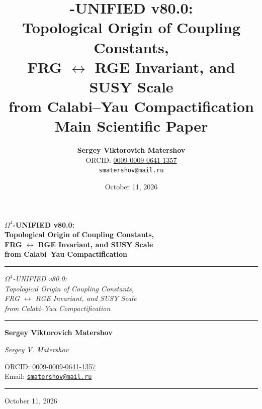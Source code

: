 \documentclass[11pt,a4paper]{article}
\title{
    \textbf{\Omtext-UNIFIED v80.0: \\[0.3em]
    Topological Origin of Coupling Constants, \\
    FRG $\leftrightarrow$ RGE Invariant, and SUSY Scale \\[0.3em]
    from Calabi--Yau Compactification} \\[0.5em]
    \large Main Scientific Paper
}
\author{
    \textbf{Sergey Viktorovich Matershov} \\
    ORCID: \href{https://orcid.org/0009-0009-0641-1357}{0009-0009-0641-1357} \\
    \small \texttt{smatershov@mail.ru}
}
\date{October 11, 2026}
\theoremstyle{definition}
\begin{document}

\begin{titlepage}
\centering

\vspace*{1.5cm}

{\LARGE\bfseries
$\Omega^4$-UNIFIED v80.0: \\[0.4em]
Topological Origin of Coupling Constants, \\[0.3em]
FRG $\leftrightarrow$ RGE Invariant, and SUSY Scale \\[0.3em]
from Calabi--Yau Compactification
\par}

\vspace{0.6cm}
\rule{0.7\textwidth}{0.4pt}
\vspace{0.6cm}

{\large\itshape
$\Omega^4$-UNIFIED v80.0: \\[0.3em]
Topological Origin of Coupling Constants, \\[0.2em]
FRG $\leftrightarrow$ RGE Invariant, and SUSY Scale \\[0.2em]
from Calabi--Yau Compactification
\par}

\vspace{1.2cm}
\rule{0.5\textwidth}{0.4pt}
\vspace{1.2cm}

{\Large\bfseries
Sergey Viktorovich Matershov
\par}

\vspace{0.5cm}

{\large\itshape
Sergey V. Matershov
\par}

\vspace{0.8cm}

{\large
ORCID: \href{https://orcid.org/0009-0009-0641-1357}{0009-0009-0641-1357} \\[0.3em]
Email: \href{mailto:smatershov@mail.ru}{\texttt{smatershov@mail.ru}}
\par}

\vspace{1.2cm}
\rule{0.5\textwidth}{0.4pt}
\vspace{0.8cm}

{\large
October 11, 2026
\par}


\end{titlepage}
\end{document}

